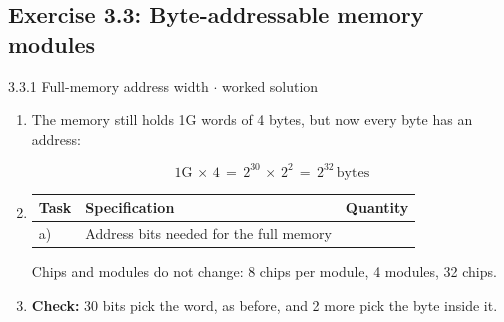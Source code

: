 \documentclass[11pt]{article}
\begin{document}
\begin{keepsection}\subsection{Exercise 3.3: Byte-addressable memory modules}

\begin{workedbox}{3.3.1 Full-memory address width \ensuremath{\cdot} worked solution}
\begin{enumerate}
\item {}
The memory still holds 1G words of 4 bytes, but now every byte has an address:

\begin{equation*}1\mathrm{G}\, \times \, 4\, =\, 2^{30}\, \times \, 2^{2}\, =\, 2^{32}\, \text{bytes}\end{equation*}
\item {}
\begin{center}\small\begin{tabularx}{\linewidth}{>{\raggedright\arraybackslash}X>{\raggedright\arraybackslash}X>{\raggedright\arraybackslash}X}\toprule
\textbf{Task} & \textbf{Specification} & \textbf{Quantity} \\ \midrule
a) & Address bits needed for the full memory & 32 \\
\bottomrule\end{tabularx}\end{center}

Chips and modules do not change: 8 chips per module, 4 modules, 32 chips.
\item \textbf{Check:} 30 bits pick the word, as before, and 2 more pick the byte inside it.
\end{enumerate}
\end{workedbox}

\end{keepsection}
\end{document}
